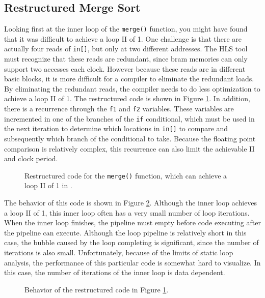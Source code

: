 \subsection{Restructured Merge Sort}
Looking first at the inner loop of the \lstinline{merge()} function, you might have found that it was difficult to achieve a loop II of 1.  One challenge is that there are actually four reads of \lstinline{in[]}, but only at two different addresses.   The HLS tool must recognize that these reads are redundant, since \gls{bram} memories can only support two accesses each clock.  However because these reads are in different basic blocks, it is more difficult for a compiler to eliminate the redundant loads.  By eliminating the redundant reads, the compiler needs to do less optimization to achieve a loop II of 1.  The restructured code is shown in Figure \ref{fig:merge_sort_restructured.cpp}.  In addition, there is a recurrence through the \lstinline{f1} and \lstinline{f2} variables.  These variables are incremented in one of the branches of the \lstinline{if} conditional, which must be used in the next iteration to determine which locations in \lstinline{in[]} to compare and subsequently which branch of the conditional to take.  Because the floating point comparison is relatively complex, this recurrence can also limit the achievable II and clock period.

\begin{figure}

\caption{Restructured code for the \lstinline{merge()} function, which can achieve a loop II of 1 in \VHLS.}
\label{fig:merge_sort_restructured.cpp}
\end{figure}

The behavior of this code is shown in Figure \ref{fig:merge_sort_restructured_behavior}.  Although the inner loop achieves a loop II of 1, this inner loop often has a very small number of loop iterations.  When the inner loop finishes, the pipeline must empty before code executing after the pipeline can execute.  Although the loop pipeline is relatively short in this case, the bubble caused by the loop completing is significant, since the number of iterations is also small.  Unfortunately, because of the limits of static loop analysis, the performance of this particular code is somewhat hard to visualize.  In this case, the number of iterations of the inner loop is data dependent.

\begin{figure}
\centering

\caption{Behavior of the restructured code in Figure \ref{fig:merge_sort_restructured.cpp}.}
\label{fig:merge_sort_restructured_behavior}
\end{figure}

